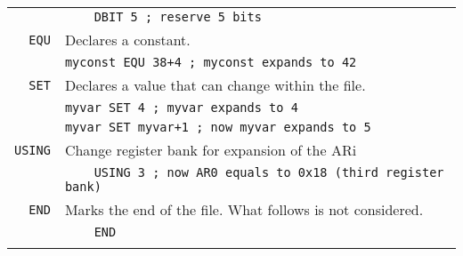 \documentclass{article}
\begin{document}
\begin{tabularx}{\textwidth}{rX}
  &\texttt{\ \ \ \ DBIT 5 ; reserve 5 bits}\\
  \noalign{\smallskip}
  \hline
  \noalign{\smallskip}
  \texttt{EQU}&Declares a constant.\\
  &\texttt{myconst EQU 38+4 ; myconst expands to 42}\\
  \noalign{\smallskip}
  \hline
  \noalign{\smallskip}
  \texttt{SET}&Declares a value that can change within the file.\\
  &\texttt{myvar SET 4 ; myvar expands to 4}\\
  &\texttt{myvar SET myvar+1 ; now myvar expands to 5}\\
  \noalign{\smallskip}
  \hline
  \noalign{\smallskip}
  \texttt{USING}&Change register bank for expansion of the ARi\\
  &\texttt{\ \ \ \ USING 3 ; now AR0 equals to 0x18 (third register bank)}\\
  \noalign{\smallskip}
  \hline
  \noalign{\smallskip}
  \texttt{END}&Marks the end of the file. What follows is not considered.\\
  &\texttt{\ \ \ \ END}\\
  \noalign{\smallskip}
  \hline
\end{tabularx}
\end{document}
